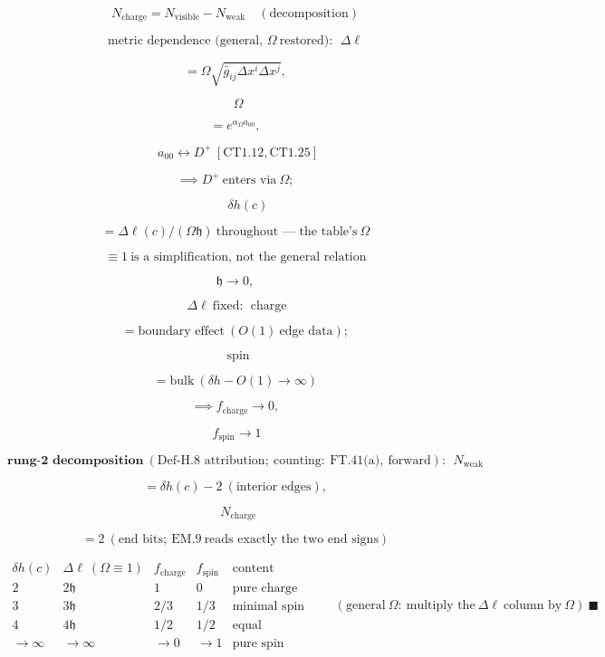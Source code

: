 \begin{theorem}
\[
N_{\mathrm{charge}}=N_{\mathrm{visible}}-N_{\mathrm{weak}}\quad(\text{decomposition})
\]

\[
\text{metric dependence (general, }\Omega\ \text{restored)}:\ \ \Delta\ell
\]

\[
= \Omega\sqrt{\bar g_{ij}\Delta x^i\Delta x^j},
\]

\[
\ \ \Omega
\]

\[
= e^{\alpha_\Omega a_{00}},
\]

\[
\ \ a_{00}\leftrightarrow D^+\ [\mathrm{CT1.12},\mathrm{CT1.25}]
\]

\[
\implies D^+\ \text{enters via}\ \Omega;
\]

\[
\qquad \delta h(c)
\]

\[
= \Delta\ell(c)/(\Omega\mathfrak h)\ \text{throughout — the table's}\ \Omega
\]

\[
\equiv 1\ \text{is a simplification, not the general relation}
\]

\[
\mathfrak h\to0,
\]

\[
\ \Delta\ell\ \text{fixed}:\ \ \text{charge}
\]

\[
= \text{boundary effect}\ (O(1)\ \text{edge data});
\]

\[
\ \ \text{spin}
\]

\[
= \text{bulk}\ (\delta h-O(1)\to\infty)
\]

\[
\implies f_{\mathrm{charge}}\to0,
\]

\[
\ f_{\mathrm{spin}}\to1
\]

\[
\textbf{rung-2 decomposition}\ (\text{Def-H.8 attribution};\ \text{counting}:\ \text{FT.41(a)},\ \text{forward}):\ \ N_{\mathrm{weak}}
\]

\[
= \delta h(c)-2\ (\text{interior edges}),
\]

\[
\ \ N_{\mathrm{charge}}
\]

\[
= 2\ (\text{end bits};\ \mathrm{EM.9}\ \text{reads exactly the two end signs})
\]

\[
\begin{array}{c|c|c|c|c}
\delta h(c) & \Delta\ell\ (\Omega\equiv1) & f_{\mathrm{charge}} & f_{\mathrm{spin}} & \text{content}\\ \hline
2 & 2\mathfrak h & 1 & 0 & \text{pure charge}\\
3 & 3\mathfrak h & 2/3 & 1/3 & \text{minimal spin}\\
4 & 4\mathfrak h & 1/2 & 1/2 & \text{equal}\\
\to\infty & \to\infty & \to0 & \to1 & \text{pure spin}
\end{array}\qquad(\text{general}\ \Omega:\ \text{multiply the}\ \Delta\ell\ \text{column by}\ \Omega)\ \blacksquare
\]


\end{theorem}
